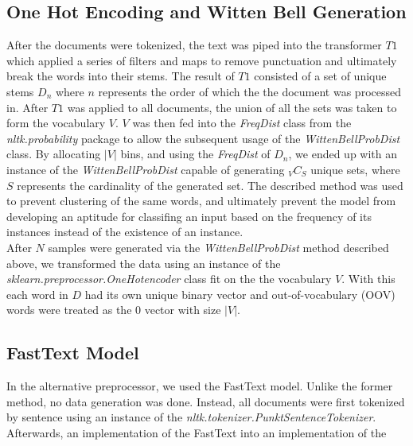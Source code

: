 \documentclass[12pt]{report}
\begin{document}
\subsection{One Hot Encoding and Witten Bell Generation} 
After the documents were tokenized, the text was piped into the transformer $T1$ which applied a
series of filters and maps to remove punctuation and ultimately break the words
into their stems. The result of $T1$ consisted of a set of unique stems $D_n$
where $n$ represents the order of which the the document was processed in.
After $T1$ was applied to all documents, the union of all the sets was taken to
form the vocabulary $V$. $V$ was then fed into the \emph{FreqDist} class from
the \emph{nltk.probability} package to allow the subsequent usage of the
\emph{WittenBellProbDist} class. By allocating $|V|$ bins, and using the
\emph{FreqDist} of $D_n$, we ended up with an instance of the
\emph{WittenBellProbDist} capable of generating ${}_{V}C_{S}$ unique sets,
where $S$ represents the cardinality of the generated set. The described method
was used to prevent clustering of the same words, and ultimately prevent the
model from developing an aptitude for classifing an input based on the
frequency of its instances instead of the existence of an instance.\\

After $N$ samples were generated via the \emph{WittenBellProbDist} method
described above, we transformed the data using an instance of the
\emph{sklearn.preprocessor.OneHotencoder} class fit on the the vocabulary $V$.
With this each word in $D$ had its own unique binary vector and out-of-vocabulary (OOV)
words were treated as the $0$ vector with size $|V|$.

\subsection{FastText Model}
In the alternative preprocessor, we used the FastText model. Unlike the former method,
no data generation was done. Instead, all documents were first tokenized by sentence using
an instance of the \emph{nltk.tokenizer.PunktSentenceTokenizer}. Afterwards, an implementation 
of the FastText 
into an implementation of the 

%
\end{document}
